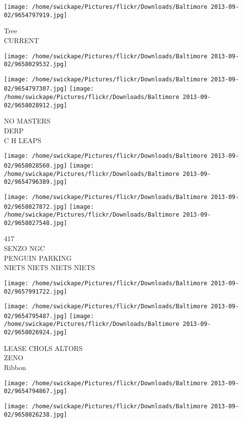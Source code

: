 \documentclass[10pt,letterpaper]{article}
\begin{document}
\vspace{0.25in}
\texttt{[image: /home/swickape/Pictures/flickr/Downloads/Baltimore 2013-09-02/9654797919.jpg]}

Tree\\
CURRENT
\pagebreak

\texttt{[image: /home/swickape/Pictures/flickr/Downloads/Baltimore 2013-09-02/9658029532.jpg]}

\vspace{0.25in}
\texttt{[image: /home/swickape/Pictures/flickr/Downloads/Baltimore 2013-09-02/9654797307.jpg]}
\texttt{[image: /home/swickape/Pictures/flickr/Downloads/Baltimore 2013-09-02/9658028912.jpg]}

NO MASTERS\\
DERP\\
C H LEAPS
\pagebreak

\texttt{[image: /home/swickape/Pictures/flickr/Downloads/Baltimore 2013-09-02/9658028560.jpg]}
\texttt{[image: /home/swickape/Pictures/flickr/Downloads/Baltimore 2013-09-02/9654796389.jpg]}

\texttt{[image: /home/swickape/Pictures/flickr/Downloads/Baltimore 2013-09-02/9658027872.jpg]}
\texttt{[image: /home/swickape/Pictures/flickr/Downloads/Baltimore 2013-09-02/9658027548.jpg]}

417\\
SENZO NGC\\
PENGUIN PARKING\\
NIETS NIETS NIETS NIETS
\pagebreak

\texttt{[image: /home/swickape/Pictures/flickr/Downloads/Baltimore 2013-09-02/9657991722.jpg]}

\vspace{0.25in}
\texttt{[image: /home/swickape/Pictures/flickr/Downloads/Baltimore 2013-09-02/9654795487.jpg]}
\texttt{[image: /home/swickape/Pictures/flickr/Downloads/Baltimore 2013-09-02/9658026924.jpg]}

LEASE CHOLS ALTORS\\
ZENO\\
Ribbon
\pagebreak

\texttt{[image: /home/swickape/Pictures/flickr/Downloads/Baltimore 2013-09-02/9654794867.jpg]}

\vspace{0.25in}
\texttt{[image: /home/swickape/Pictures/flickr/Downloads/Baltimore 2013-09-02/9658026238.jpg]}
\end{document}
